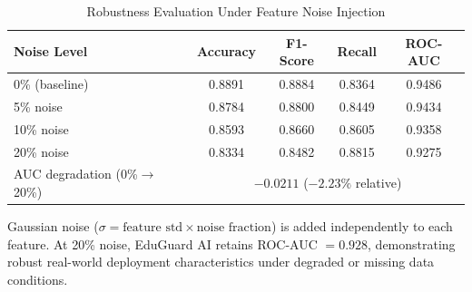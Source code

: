 
\begin{table}[!t]
  \renewcommand{\arraystretch}{1.25}
  \caption{Robustness Evaluation Under Feature Noise Injection}
  \label{tab:robustness}
  \centering
  \begin{tabular}{lcccc}
    \hline
    \textbf{Noise Level} & \textbf{Accuracy} & \textbf{F1-Score} & \textbf{Recall} & \textbf{ROC-AUC} \\
    \hline
    0\%  (baseline)  & 0.8891 & 0.8884 & 0.8364 & 0.9486 \\
    5\%  noise       & 0.8784 & 0.8800 & 0.8449 & 0.9434 \\
    10\% noise       & 0.8593 & 0.8660 & 0.8605 & 0.9358 \\
    20\% noise       & 0.8334 & 0.8482 & 0.8815 & 0.9275 \\
    \hline
    AUC degradation (0\%$\to$20\%) & \multicolumn{4}{c}{$-0.0211$ ($-2.23\%$ relative)} \\
    \hline
  \end{tabular}
  \vspace{1mm}
  \begin{flushleft}
    \small
    Gaussian noise ($\sigma = \text{feature std} \times \text{noise fraction}$)
    is added independently to each feature.
    At 20\% noise, EduGuard AI retains ROC-AUC $= 0.928$, demonstrating
    robust real-world deployment characteristics under degraded or missing data conditions.
  \end{flushleft}
\end{table}



